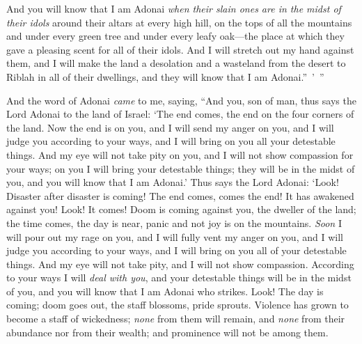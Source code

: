 \begin{biblechapter}
\verse And you will know that I am Adonai \textit{when their slain ones are in the midst of their idols} around their altars at every high hill, on the tops of all the mountains and under every green tree and under every leafy oak—the place at which they gave a pleasing scent for all of their idols.
\verse And I will stretch out my hand against them, and I will make the land a desolation and a wasteland from the desert to Riblah in all of their dwellings, and they will know that I am Adonai.” ’ ”
\end{biblechapter}

\begin{biblechapter} %
 And the word of Adonai \textit{came} to me, saying,
\verse “And you, son of man, thus says the Lord Adonai to the land of Israel: ‘The end comes, the end on the four corners of the land.
\verse Now the end is on you, and I will send my anger on you, and I will judge you according to your ways, and I will bring on you all your detestable things.
\verse And my eye will not take pity on you, and I will not show compassion for your ways; on you I will bring your detestable things; they will be in the midst of you, and you will know that I am Adonai.’
\verse Thus says the Lord Adonai: ‘Look! Disaster after disaster is coming!
\verse The end comes, comes the end! It has awakened against you! Look! It comes!
\verse Doom is coming against you, the dweller of the land; the time comes, the day is near, panic and not joy is on the mountains.
\verse \textit{Soon} I will pour out my rage on you, and I will fully vent my anger on you, and I will judge you according to your ways, and I will bring on you all of your detestable things.
\verse And my eye will not take pity, and I will not show compassion. According to your ways I will \textit{deal with you}, and your detestable things will be in the midst of you, and you will know that I am Adonai who strikes.
\verse Look! The day is coming; doom goes out, the staff blossoms, pride sprouts.
\verse Violence has grown to become a staff of wickedness; \textit{none} from them will remain, and \textit{none} from their abundance nor from their wealth; and prominence will not be among them.

\end{biblechapter}

